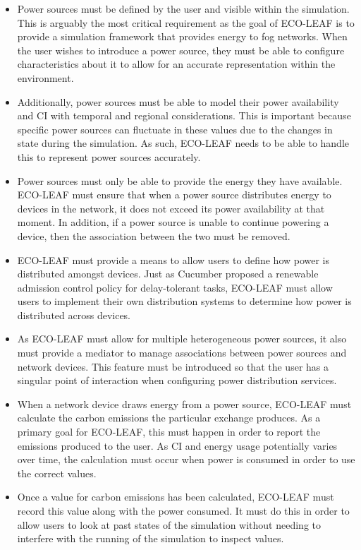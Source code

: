 \documentclass{l4proj}
\begin{document}
\begin{itemize}
    \item Power sources must be defined by the user and visible within the simulation. This is arguably the most critical requirement as the goal of ECO-LEAF is to provide a simulation framework that provides energy to fog networks. When the user wishes to introduce a power source, they must be able to configure characteristics about it to allow for an accurate representation within the environment.
    \item Additionally, power sources must be able to model their power availability and CI with temporal and regional considerations. This is important because specific power sources can fluctuate in these values due to the changes in state during the simulation. As such, ECO-LEAF needs to be able to handle this to represent power sources accurately.
    \item Power sources must only be able to provide the energy they have available. ECO-LEAF must ensure that when a power source distributes energy to devices in the network, it does not exceed its power availability at that moment. In addition, if a power source is unable to continue powering a device, then the association between the two must be removed.
    \item ECO-LEAF must provide a means to allow users to define how power is distributed amongst devices. Just as Cucumber \citep{cucumber} proposed a renewable admission control policy for delay-tolerant tasks, ECO-LEAF must allow users to implement their own distribution systems to determine how power is distributed across devices.
    \item As ECO-LEAF must allow for multiple heterogeneous power sources, it also must provide a mediator to manage associations between power sources and network devices. This feature must be introduced so that the user has a singular point of interaction when configuring power distribution services.
    \item When a network device draws energy from a power source, ECO-LEAF must calculate the carbon emissions the particular exchange produces. As a primary goal for ECO-LEAF, this must happen in order to report the emissions produced to the user. As CI and energy usage potentially varies over time, the calculation must occur when power is consumed in order to use the correct values.
    \item Once a value for carbon emissions has been calculated, ECO-LEAF must record this value along with the power consumed. It must do this in order to allow users to look at past states of the simulation without needing to interfere with the running of the simulation to inspect values.

\end{itemize}
\end{document}
